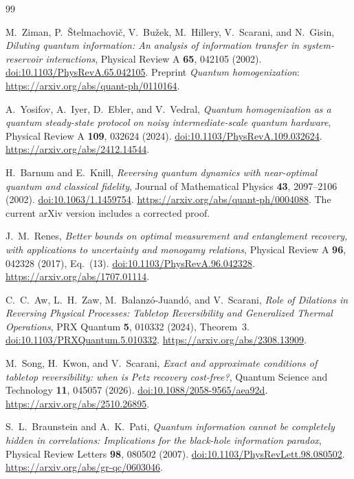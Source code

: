 \documentclass[11pt]{article}
\numberwithin{equation}{section}
\theoremstyle{remark}
\begin{document}
\begin{thebibliography}{99}
\raggedright
\small
\setlength{\itemsep}{2pt}
\setlength{\parsep}{0pt}
M.~Ziman, P.~\v{S}telmachovi\v{c}, V.~Bu\v{z}ek, M.~Hillery,
V.~Scarani, and N.~Gisin,
\emph{Diluting quantum information: An analysis of information transfer in
system-reservoir interactions}, Physical Review A \textbf{65}, 042105 (2002).
\href{https://doi.org/10.1103/PhysRevA.65.042105}
{doi:10.1103/PhysRevA.65.042105}.
Preprint \emph{Quantum homogenization}:
\url{https://arxiv.org/abs/quant-ph/0110164}.

A.~Yosifov, A.~Iyer, D.~Ebler, and V.~Vedral,
\emph{Quantum homogenization as a quantum steady-state protocol on noisy
intermediate-scale quantum hardware}, Physical Review A \textbf{109},
032624 (2024).
\href{https://doi.org/10.1103/PhysRevA.109.032624}
{doi:10.1103/PhysRevA.109.032624}.
\url{https://arxiv.org/abs/2412.14544}.

H.~Barnum and E.~Knill,
\emph{Reversing quantum dynamics with near-optimal quantum and classical
fidelity}, Journal of Mathematical Physics \textbf{43}, 2097--2106 (2002).
\href{https://doi.org/10.1063/1.1459754}{doi:10.1063/1.1459754}.
\url{https://arxiv.org/abs/quant-ph/0004088}.
The current arXiv version includes a corrected proof.

J.~M.~Renes,
\emph{Better bounds on optimal measurement and entanglement recovery, with
applications to uncertainty and monogamy relations}, Physical Review A
\textbf{96}, 042328 (2017), Eq.~(13).
\href{https://doi.org/10.1103/PhysRevA.96.042328}
{doi:10.1103/PhysRevA.96.042328}.
\url{https://arxiv.org/abs/1707.01114}.

C.~C.~Aw, L.~H.~Zaw, M.~Balanz\'o-Juand\'o, and V.~Scarani,
\emph{Role of Dilations in Reversing Physical Processes: Tabletop
Reversibility and Generalized Thermal Operations}, PRX Quantum \textbf{5},
010332 (2024), Theorem~3.
\href{https://doi.org/10.1103/PRXQuantum.5.010332}
{doi:10.1103/PRXQuantum.5.010332}.
\url{https://arxiv.org/abs/2308.13909}.

M.~Song, H.~Kwon, and V.~Scarani,
\emph{Exact and approximate conditions of tabletop reversibility: when is
Petz recovery cost-free?}, Quantum Science and Technology \textbf{11},
045057 (2026).
\href{https://doi.org/10.1088/2058-9565/aea92d}
{doi:10.1088/2058-9565/aea92d}.
\url{https://arxiv.org/abs/2510.26895}.

S.~L.~Braunstein and A.~K.~Pati,
\emph{Quantum information cannot be completely hidden in correlations:
Implications for the black-hole information paradox},
Physical Review Letters \textbf{98}, 080502 (2007).
\href{https://doi.org/10.1103/PhysRevLett.98.080502}
{doi:10.1103/PhysRevLett.98.080502}.
\url{https://arxiv.org/abs/gr-qc/0603046}.


\end{thebibliography}
\end{document}
